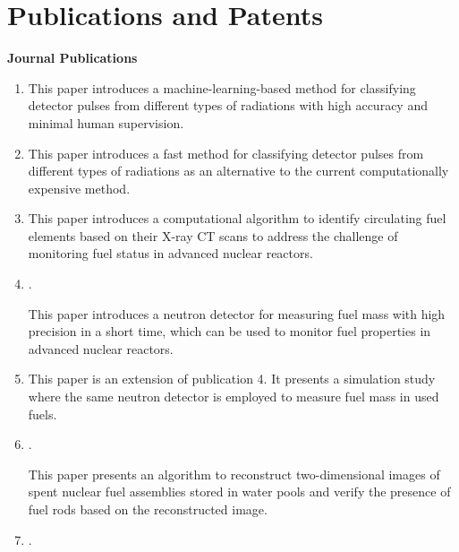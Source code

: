 \documentclass[letterpaper,11pt]{article} %
\begin{document}
\section{Publications and Patents}
\hspace{1.5em}\textbf{Journal Publications}
\begin{enumerate}
    \item {}

    This paper introduces a machine-learning-based method for classifying detector pulses from different types of radiations with high accuracy and minimal human supervision.
    \item {}

    This paper introduces a fast method for classifying detector pulses from different types of radiations as an alternative to the current computationally expensive method.  
    \item {}
    
    This paper introduces a computational algorithm to identify circulating fuel elements based on their X-ray CT scans to address the challenge of monitoring fuel status in advanced nuclear reactors.
    \item {}. 
    
    This paper introduces a neutron detector for measuring fuel mass with high precision in a short time, which can be used to monitor fuel properties in advanced nuclear reactors.
    
    \item {}
    
    This paper is an extension of publication 4. It presents a simulation study where the same neutron detector is employed to measure fuel mass in used fuels.
    \item {}. 
    
    This paper presents an algorithm to reconstruct two-dimensional images of spent nuclear fuel assemblies stored in water pools and verify the presence of fuel rods based on the reconstructed image.
    \item {}. 
    

\end{enumerate}
\end{document}
